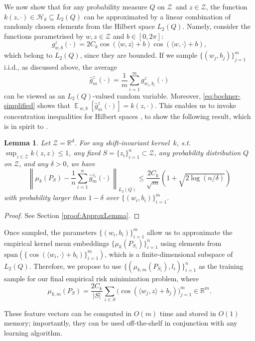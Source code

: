 \documentclass{article}
\newtheorem{lemma}{Lemma}
\DeclareMathOperator*{\E}{\mathbb{E}\,}
\renewcommand{\H}{\mathcal{H}}
\newcommand{\Z}{\mathcal{Z}}
\newcommand{\R}{\mathbb{R}}
\begin{document}
We now show that for any probability measure $Q$ on $\Z$~and $z\in\Z$, the
function $k(z,\cdot)\in\H_k\subseteq L_2(Q)$ can be approximated by a linear
combination of randomly chosen elements from the Hilbert space $L_2(Q)$.
Namely, consider the functions parametrised by $w,z\in\Z$ and $b\in[0,2\pi]$:
\begin{equation}
\label{eq:cosine-feature}
g_{w,b}^z (\cdot) = 2C_k\cos(\langle w,z\rangle + b)\cos(\langle w,\cdot\rangle + b),
\end{equation}
which belong to $L_2(Q)$, since they are bounded.  If we sample
$\{(w_j,b_j)\}_{j=1}^m$ i.i.d., as discussed above, the average 
\[
\hat{g}_m^z(\cdot) = \frac{1}{m}\sum_{i=1}^m g_{w_i,b_i}^z(\cdot)
\]
can be viewed as an $L_2(Q)$-valued random variable.  Moreover,
\eqref{eq:bochner-simplified} shows that $\E_{w,b}[\hat{g}_m^z(\cdot)] =
k(z,\cdot)$.  This enables us to invoke concentration inequalities for Hilbert
spaces \cite{LT91}, to show the following result, which is in spirit to
\citet[Lemma 1]{Rahimi09}.
\begin{lemma}
\label{lemma:approx}
Let $\Z=\R^d$.  For any shift-invariant kernel~$k$, s.t.
$\sup_{z\in\Z}k(z,z)\leq 1$, any fixed $S=\{z_i\}_{i=1}^n\subset \Z$, any
probability distribution $Q$ on $\Z$, and any $\delta > 0$, we have
\[
\left\|\mu_k(P_S) - \frac{1}{n}\sum_{i=1}^n\hat{g}_m^{z_i}(\cdot)\right\|_{L_2(Q)}
\!\!\!\!\!\leq 
\frac{2C_k}{\sqrt{m}}\left(1 + \sqrt{{2\log(n/\delta)}}\right)
\]
with probability larger than $1-\delta$ over $\{(w_i,b_i)\}_{i=1}^m$.
\end{lemma}
\begin{proof}
See Section \ref{proof:ApproxLemma}.
\end{proof}

Once sampled, the parameters $\{(w_i,b_i)\}_{i=1}^m$ allow us to approximate
the empirical kernel mean embeddings $\{\mu_k(P_{S_i})\}_{i=1}^n$ using
elements from $\text{span}({\{\cos(\langle w_i, \cdot\rangle +
b_i)\}_{i=1}^m})$, which is a finite-dimensional subspace of $L_2(Q)$.  
Therefore, we propose to
use $\{(\mu_{k,m}(P_{S_i}),l_i)\}_{i=1}^n$ as the training sample for our final
empirical risk minimization problem, where
\begin{equation}\label{eq:meank3}
  \mu_{k,m}(P_S) = \frac{2C_k}{|S|} \sum_{z\in S} \bigl( \cos(\langle w_j,
  z\rangle + b_j)\bigr)_{j=1}^m \in
  \R^m.
\end{equation}

These feature vectors can be computed in $O(m)$ time and stored in $O(1)$
memory; importantly, they can be used off-the-shelf in conjunction with any
learning algorithm.
\end{document}
